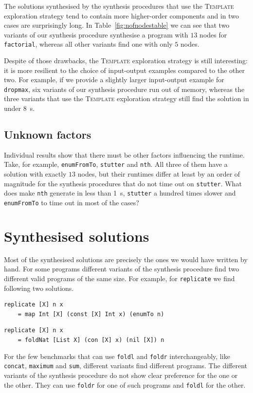 The solutions synthesised by the synthesis procedures that use the \textsc{Template} exploration strategy tend to contain more higher-order components and in two cases are surprisingly long. In Table~\ref{fig:nofnodestable} we can see that two variants of our synthesis procedure synthesise a program with $13$ nodes for \lstinline?factorial?, whereas all other variants find one with only $5$ nodes.

Despite of those drawbacks, the \textsc{Template} exploration strategy is still interesting: it is more resilient to the choice of input-output examples compared to the other two. For example, if we provide a slightly larger input-output example for \lstinline?dropmax?, six variants of our synthesis procedure run out of memory, whereas the three variants that use the \textsc{Template} exploration strategy still find the solution in under \SI{8}{s}.

\subsection{Unknown factors}
Individual results show that there must be other factors influencing the runtime. Take, for example, \lstinline?enumFromTo?, \lstinline?stutter? and \lstinline?nth?. All three of them have a solution with exactly $13$ nodes, but their runtimes differ at least by an order of magnitude for the synthesis procedures that do not time out on \lstinline?stutter?. What does make \lstinline?nth? generate in less than \SI{1}{s}, \lstinline?stutter? a hundred times slower and \lstinline?enumFromTo? to time out in most of the cases?

\section{Synthesised solutions}
Most of the synthesised solutions are precisely the ones we would have written by hand. For some programs different variants of the synthesis procedure find two different valid programs of the same size. For example, for \lstinline?replicate? we find following two solutions.
\begin{lstlisting}
replicate [X] n x
    = map Int [X] (const [X] Int x) (enumTo n)
\end{lstlisting}
\begin{lstlisting}
replicate [X] n x
    = foldNat [List X] (con [X] x) (nil [X]) n
\end{lstlisting}

For the few benchmarks that can use \lstinline?foldl? and \lstinline?foldr? interchangeably, like \lstinline?concat?, \lstinline?maximum? and \lstinline?sum?, different variants find different programs. The different variants of the synthesis procedure do not show clear preference for the one or the other. They can use \lstinline?foldr? for one of such programs and \lstinline?foldl? for the other.

